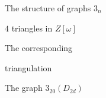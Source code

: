 \documentclass[%
pdf,
colorBG,
slideColor,
]{prosper}
\begin{document}
\begin{slide}{The structure of graphs $3_n$}

\vspace{-4mm}
\begin{center}
\begin{minipage}{5cm}
\centering
{}\par
$4$ triangles in $Z[\omega]$
\end{minipage}
\begin{minipage}{5cm}
\centering
{}\par
The corresponding\par
triangulation
\end{minipage}
\end{center}

\begin{center}
\begin{minipage}{5cm}
\par
\end{minipage}
\begin{minipage}{5cm}
\hspace{-1cm}The graph $3_{20}(D_{2d})$
\end{minipage}
\end{center}

\end{slide}
\end{document}
